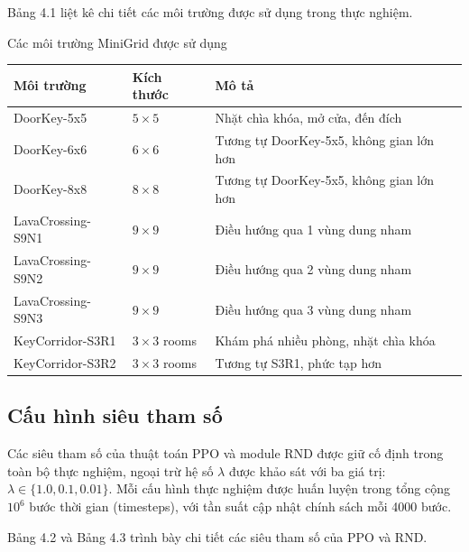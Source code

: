 \documentclass{uetgraduation}
\begin{document}
Bảng 4.1 liệt kê chi tiết các môi trường được sử dụng trong thực nghiệm.

\begin{table}[H]{Các môi trường MiniGrid được sử dụng}
\centering
\begin{tabular}{|l|l|p{7cm}|}
\hline
\textbf{Môi trường} & \textbf{Kích thước} & \textbf{Mô tả} \\
\hline
DoorKey-5x5 & $5 \times 5$ & Nhặt chìa khóa, mở cửa, đến đích \\
\hline
DoorKey-6x6 & $6 \times 6$ & Tương tự DoorKey-5x5, không gian lớn hơn \\
\hline
DoorKey-8x8 & $8 \times 8$ & Tương tự DoorKey-5x5, không gian lớn hơn \\
\hline
LavaCrossing-S9N1 & $9 \times 9$ & Điều hướng qua 1 vùng dung nham \\
\hline
LavaCrossing-S9N2 & $9 \times 9$ & Điều hướng qua 2 vùng dung nham \\
\hline
LavaCrossing-S9N3 & $9 \times 9$ & Điều hướng qua 3 vùng dung nham \\
\hline
KeyCorridor-S3R1 & $3 \times 3$ rooms & Khám phá nhiều phòng, nhặt chìa khóa \\
\hline
KeyCorridor-S3R2 & $3 \times 3$ rooms & Tương tự S3R1, phức tạp hơn \\
\hline
\end{tabular}
\label{tab:environments}
\end{table}

\subsection{Cấu hình siêu tham số}

Các siêu tham số của thuật toán PPO và module RND được giữ cố định trong toàn bộ thực nghiệm, ngoại trừ hệ số $\lambda$ được khảo sát với ba giá trị: $\lambda \in \{1.0, 0.1, 0.01\}$. Mỗi cấu hình thực nghiệm được huấn luyện trong tổng cộng $10^6$ bước thời gian (timesteps), với tần suất cập nhật chính sách mỗi 4000 bước.

Bảng 4.2 và Bảng 4.3 trình bày chi tiết các siêu tham số của PPO và RND.
\end{document}
